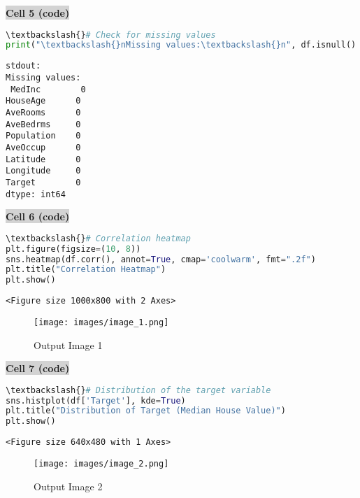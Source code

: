 \documentclass{article}
\begin{document}
\vspace{0.5cm}
\noindent\colorbox{lightgray}{\textbf{Cell 5 (code)}}
\vspace{0.3cm}


\begin{lstlisting}[language=Python]
\textbackslash{}# Check for missing values
print("\textbackslash{}nMissing values:\textbackslash{}n", df.isnull().sum())
\end{lstlisting}


\begin{verbatim}
stdout: 
Missing values:
 MedInc        0
HouseAge      0
AveRooms      0
AveBedrms     0
Population    0
AveOccup      0
Latitude      0
Longitude     0
Target        0
dtype: int64

\end{verbatim}


\vspace{0.5cm}
\noindent\colorbox{lightgray}{\textbf{Cell 6 (code)}}
\vspace{0.3cm}


\begin{lstlisting}[language=Python]
\textbackslash{}# Correlation heatmap
plt.figure(figsize=(10, 8))
sns.heatmap(df.corr(), annot=True, cmap='coolwarm', fmt=".2f")
plt.title("Correlation Heatmap")
plt.show()
\end{lstlisting}


\begin{verbatim}
<Figure size 1000x800 with 2 Axes>
\end{verbatim}


\begin{figure}[h]
\centering
\texttt{[image: images/image\_1.png]}
\caption{Output Image 1}
\end{figure}


\vspace{0.5cm}
\noindent\colorbox{lightgray}{\textbf{Cell 7 (code)}}
\vspace{0.3cm}


\begin{lstlisting}[language=Python]
\textbackslash{}# Distribution of the target variable
sns.histplot(df['Target'], kde=True)
plt.title("Distribution of Target (Median House Value)")
plt.show()
\end{lstlisting}


\begin{verbatim}
<Figure size 640x480 with 1 Axes>
\end{verbatim}


\begin{figure}[h]
\centering
\texttt{[image: images/image\_2.png]}
\caption{Output Image 2}
\end{figure}
\end{document}
